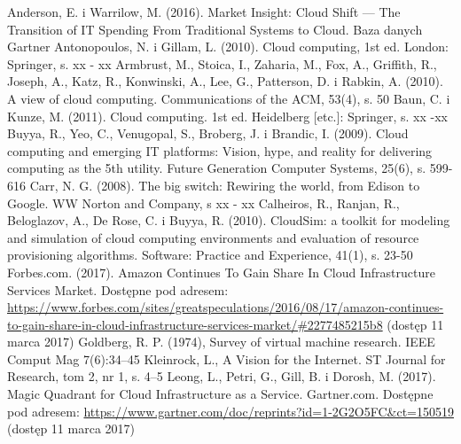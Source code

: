 \documentclass[12pt,a4paper,twoside]{article}
\begin{document}
\begin{thebibliography}{99}
\setlength{\itemsep}{0pt}%
 Anderson, E. i Warrilow, M. (2016). Market Insight: Cloud Shift — The Transition of IT Spending From Traditional Systems to Cloud. Baza danych Gartner
 Antonopoulos, N. i Gillam, L. (2010). Cloud computing, 1st ed. London: Springer, s. xx - xx
 Armbrust, M., Stoica, I., Zaharia, M., Fox, A., Griffith, R., Joseph, A., Katz, R., Konwinski, A., Lee, G., Patterson, D. i Rabkin, A. (2010). A view of cloud computing. Communications of the ACM, 53(4), s. 50
 Baun, C. i Kunze, M. (2011). Cloud computing. 1st ed. Heidelberg [etc.]: Springer, s. xx -xx
 Buyya, R., Yeo, C., Venugopal, S., Broberg, J. i Brandic, I. (2009). Cloud computing and emerging IT platforms: Vision, hype, and reality for delivering computing as the 5th utility. Future Generation Computer Systems, 25(6), s. 599-616
 Carr, N. G. (2008). The big switch: Rewiring the world, from Edison to Google. WW Norton and Company, s xx - xx
 Calheiros, R., Ranjan, R., Beloglazov, A., De Rose, C. i Buyya, R. (2010). CloudSim: a toolkit for modeling and simulation of cloud computing environments and evaluation of resource provisioning algorithms. Software: Practice and Experience, 41(1), s. 23-50
 Forbes.com. (2017). Amazon Continues To Gain Share In Cloud Infrastructure Services Market. Dostępne pod adresem: \url{https://www.forbes.com/sites/greatspeculations/2016/08/17/amazon-continues-to-gain-share-in-cloud-infrastructure-services-market/#2277485215b8} (dostęp 11 marca 2017)
 Goldberg, R. P. (1974), Survey of virtual machine research. IEEE Comput Mag 7(6):34–45
 Kleinrock, L., A Vision for the Internet. ST Journal for Research, tom 2, nr 1, s. 4–5
 Leong, L., Petri, G., Gill, B. i Dorosh, M. (2017). Magic Quadrant for Cloud Infrastructure as a Service. Gartner.com. Dostępne pod adresem: \url{https://www.gartner.com/doc/reprints?id=1-2G2O5FC&ct=150519} (dostęp 11 marca 2017)

\end{thebibliography}
\end{document}

